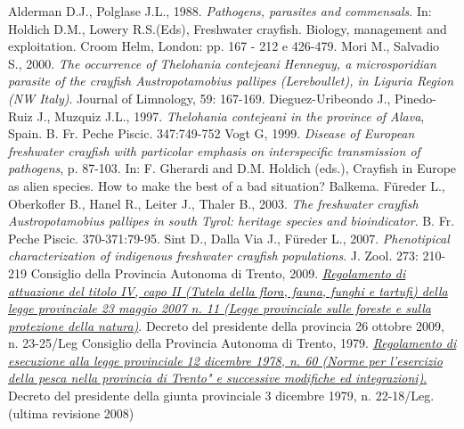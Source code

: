 \documentclass[10pt,twoside,openany,x11names,svgnames,italian,a5paper,dvipsnames,table]{memoir}
\begin{document}
\begin{thebibliography}{9}
 Alderman D.J., Polglase J.L., 1988. \emph{Pathogens, parasites and commensals}. In:  Holdich D.M., Lowery R.S.(Eds), Freshwater crayfish. Biology, management and exploitation. Croom Helm, London: pp. 167 - 212 e 426-479.
 Mori M., Salvadio S., 2000. \emph{The occurrence of \emph{Thelohania contejeani} Henneguy, a microsporidian parasite of the crayfish \emph{Austropotamobius pallipes} (Lereboullet), in Liguria Region (NW Italy)}. Journal of Limnology, 59: 167-169.
 Dieguez-Uribeondo J., Pinedo-Ruiz J., Muzquiz J.L., 1997. \emph{Thelohania contejeani in the province of Alava}, Spain. B. Fr. Peche Piscic. 347:749-752
 Vogt G, 1999. \emph{Disease of European freshwater crayfish with particolar emphasis on interspecific transmission of pathogens}, p. 87-103. In: F. Gherardi and D.M. Holdich (eds.), Crayfish in Europe as alien species. How to make the best of a bad situation? Balkema.
 Füreder L., Oberkofler B., Hanel R., Leiter J., Thaler B., 2003. \emph{The freshwater crayfish \emph{Austropotamobius pallipes} in south Tyrol: heritage species and bioindicator}. B. Fr. Peche Piscic. 370-371:79-95.
 Sint D., Dalla Via J., Füreder L., 2007. \emph{Phenotipical characterization of indigenous freshwater crayfish populations}. J. Zool. 273: 210-219
 Consiglio della Provincia Autonoma di Trento, 2009. \href{http://www.consiglio.provincia.tn.it}{\emph{Regolamento di attuazione del titolo IV, capo II (Tutela della flora, fauna, funghi e tartufi) della legge provinciale 23 maggio 2007 n. 11 (Legge provinciale sulle foreste e sulla protezione della natura)}}. Decreto del presidente della provincia 26 ottobre 2009, n. 23-25/Leg
 Consiglio della Provincia Autonoma di Trento, 1979. \href{http://www.consiglio.provincia.tn.it}{\emph{Regolamento di esecuzione alla legge provinciale 12 dicembre 1978, n. 60 (Norme per l'esercizio della pesca nella provincia di Trento" e successive modifiche ed integrazioni)}.} Decreto del presidente della giunta provinciale 3 dicembre 1979, n. 22-18/Leg. (ultima revisione 2008)
\end{thebibliography}
\endgroup
\cleartoverso
\end{document}
